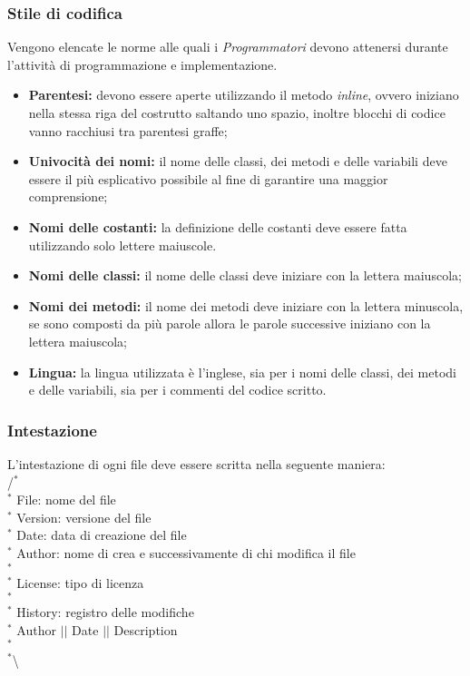 \subsubsection{Stile di codifica} 
Vengono elencate le norme alle quali i \textit{Programmatori} devono attenersi durante l'attività di programmazione e implementazione.
\begin{itemize}
	\item \textbf{Parentesi:} devono essere aperte utilizzando il metodo \textit{inline}, ovvero iniziano nella stessa riga del costrutto saltando uno spazio, inoltre blocchi di codice vanno racchiusi tra parentesi graffe;
	\item \textbf{Univocità dei nomi:} il nome delle classi, dei metodi e delle variabili deve essere il più esplicativo possibile al fine di garantire una maggior comprensione;
	\item \textbf{Nomi delle costanti:} la definizione delle costanti deve essere fatta utilizzando solo lettere maiuscole.
	\item \textbf{Nomi delle classi:} il nome delle classi deve iniziare con la lettera maiuscola;
	\item \textbf{Nomi dei metodi:} il nome dei metodi deve iniziare con la lettera minuscola, se sono composti da più parole allora le parole successive iniziano con la lettera maiuscola;
	\item \textbf{Lingua:} la lingua utilizzata è l'inglese, sia per i nomi delle classi, dei metodi e delle variabili, sia per i commenti del codice scritto.
\end{itemize}

\subsubsection{Intestazione}
L'intestazione di ogni file deve essere scritta nella seguente maniera: \\
/$^{*}$\\
$^{*}$ File: nome del file \\
$^{*}$ Version: versione del file \\
$^{*}$ Date: data di creazione del file \\
$^{*}$ Author: nome di crea e successivamente di chi modifica il file \\
$^{*}$ \\
$^{*}$ License: tipo di licenza \\
$^{*}$ \\
$^{*}$ History: registro delle modifiche \\
$^{*}$ Author $\vert$$\vert$ Date $\vert$$\vert$ Description \\
$^{*}$ \\
$^{*}$\textbackslash

